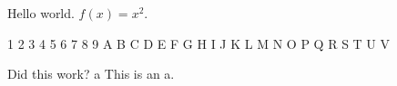 \documentclass[a4paper]{article}
\begin{document}
Hello world. $f(x)=x^2$.

{ 1 2 3 4 5 6 7 8 9 A B C D E F}
{\foo G H I J K L M N O P Q R S T U V}

Did this work?
{\foo a}
This is an a.
\end{document}
